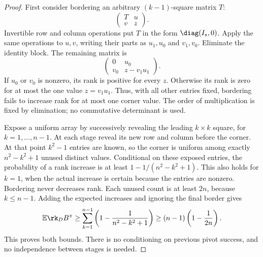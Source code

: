 \begin{proof}
First consider bordering an arbitrary \((k-1)\)-square matrix \(T\):
\[
 \begin{pmatrix}T&u\\v&z\end{pmatrix}.
\]
Invertible row and column operations put \(T\) in the form
\(\diag(I_s,0)\). Apply the same operations to \(u,v\), writing their
parts as \(u_1,u_0\) and \(v_1,v_0\). Eliminate the identity block.
The remaining matrix is
\[
 \begin{pmatrix}0&u_0\\v_0&z-v_1u_1\end{pmatrix}.
\]
If \(u_0\) or \(v_0\) is nonzero, its rank is positive for every
\(z\). Otherwise its rank is zero for at most the one value
\(z=v_1u_1\). Thus, with all other entries fixed, bordering fails to
increase rank for at most one corner value. The order of multiplication
is fixed by elimination; no commutative determinant is used.

Expose a uniform array by successively revealing the leading
\(k\times k\) square, for \(k=1,\ldots,n-1\). At each stage reveal its
new row and column before the corner. At that point \(k^2-1\) entries
are known, so the corner is uniform among exactly
\(n^2-k^2+1\) unused distinct values. Conditional on these exposed
entries, the probability of a rank increase is at least
\(1-1/(n^2-k^2+1)\). This also holds for \(k=1\), when the actual
increase is certain because the entries are nonzero. Bordering never
decreases rank. Each unused count is at least \(2n\), because
\(k\le n-1\). Adding the expected increases and ignoring the final
border gives
\[
 \mathbb E\rk_D B^\pi
 \ge\sum_{k=1}^{n-1}\left(1-\frac1{n^2-k^2+1}\right)
 \ge(n-1)\left(1-\frac1{2n}\right).
\]
This proves both bounds. There is no conditioning on previous pivot
success, and no independence between stages is needed.
\end{proof}

